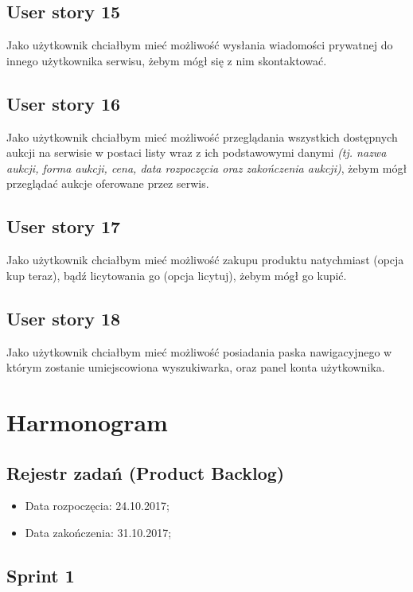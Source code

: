 \documentclass[a4paper]{article}
\begin{document}
	\subsection{User story 15}
	Jako użytkownik chciałbym mieć możliwość wysłania wiadomości prywatnej do innego użytkownika serwisu, żebym mógł się z nim skontaktować. 
	
	\subsection{User story 16}
	Jako użytkownik chciałbym mieć możliwość przeglądania wszystkich dostępnych aukcji na serwisie w postaci listy wraz z ich podstawowymi danymi \emph{(tj. nazwa aukcji, forma aukcji, cena, data rozpoczęcia oraz zakończenia aukcji)}, żebym mógł przeglądać aukcje oferowane przez serwis.
	
	\subsection{User story 17}
	Jako użytkownik chciałbym mieć możliwość zakupu produktu natychmiast (opcja kup teraz), bądź licytowania go (opcja licytuj), żebym mógł go kupić.
	
	\subsection{User story 18}
	Jako użytkownik chciałbym mieć możliwość posiadania paska nawigacyjnego w którym zostanie umiejscowiona wyszukiwarka, oraz panel konta użytkownika.
		
	\section{Harmonogram}
	
	\subsection{Rejestr zadań (Product Backlog)}
	
		\begin{itemize}
		\item Data rozpoczęcia: 24.10.2017;
		\item  Data zakończenia: 31.10.2017;
	\end{itemize}
	
	\subsection{Sprint 1}
	
\end{document}
